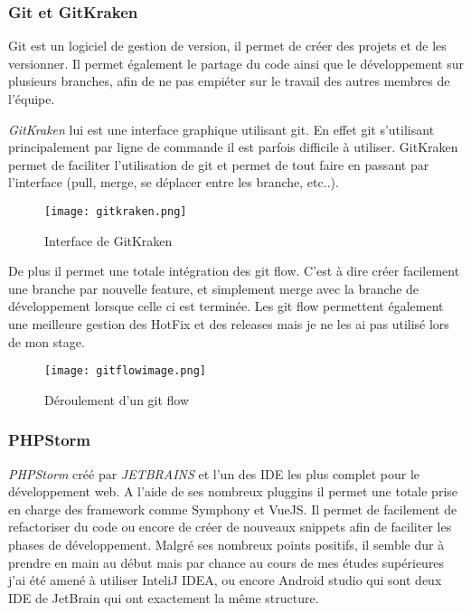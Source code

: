 \subsubsection{Git et GitKraken}
Git est un logiciel de gestion de version, il permet de créer des projets et de les versionner. Il permet également le partage du code ainsi que le développement sur plusieurs branches, afin de ne pas empiéter sur le travail des autres membres de l'équipe.

\textit{GitKraken}\cite{gitkraken} lui est une interface graphique utilisant git. En effet git s'utilisant principalement par ligne de commande il est parfois difficile à utiliser. GitKraken permet de faciliter l'utilisation de git et permet de tout faire en passant par l'interface (pull, merge, se déplacer entre les branche, etc..).

\begin{figure}[htbp]
    \center
    \texttt{[image: gitkraken.png]}
    \caption{Interface de  GitKraken}
\end{figure}

De plus il permet une totale intégration des git flow. C'est à dire créer facilement une branche par nouvelle feature, et simplement merge avec la branche de développement lorsque celle ci est terminée.
Les git flow permettent également une meilleure gestion des HotFix et des releases mais je ne les ai pas utilisé lors de mon stage. 

\begin{figure}[htbp]
    \center
\texttt{[image: gitflowimage.png]}
\caption{Déroulement d'un git flow}
\end{figure}


\subsubsection{PHPStorm}

\textit{PHPStorm}\cite{PHPStorm} créé par \textit{JETBRAINS}\cite{jetbrains} et l'un des IDE les plus complet pour le développement web.
A l'aide de ses nombreux pluggins il permet une totale prise en charge des framework comme Symphony et VueJS. Il permet de facilement de refactoriser du code  ou encore de créer de nouveaux snippets afin de faciliter les phases de développement.
Malgré ses nombreux points positifs, il semble dur à prendre en main au début mais par chance au cours de mes études supérieures j'ai été amené à utiliser InteliJ IDEA, ou encore Android studio qui sont deux IDE de JetBrain qui ont exactement la même structure. 

